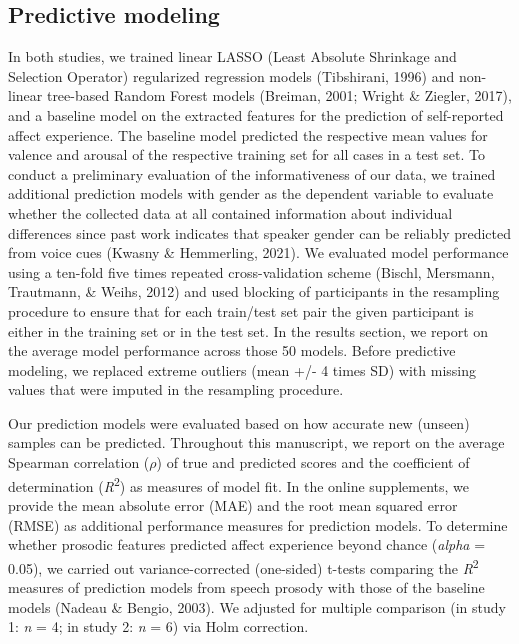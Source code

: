 \documentclass[
  english,
  man,floatsintext]{apa6}
\begin{document}
\hypertarget{predictive-modeling}{%
\subsection{Predictive modeling}\label{predictive-modeling}}

In both studies, we trained linear LASSO (Least Absolute Shrinkage and Selection Operator) regularized regression models (Tibshirani, 1996) and non-linear tree-based Random Forest models (Breiman, 2001; Wright \& Ziegler, 2017), and a baseline model on the extracted features for the prediction of self-reported affect experience. The baseline model predicted the respective mean values for valence and arousal of the respective training set for all cases in a test set. To conduct a preliminary evaluation of the informativeness of our data, we trained additional prediction models with gender as the dependent variable to evaluate whether the collected data at all contained information about individual differences since past work indicates that speaker gender can be reliably predicted from voice cues (Kwasny \& Hemmerling, 2021). We evaluated model performance using a ten-fold five times repeated cross-validation scheme (Bischl, Mersmann, Trautmann, \& Weihs, 2012) and used blocking of participants in the resampling procedure to ensure that for each train/test set pair the given participant is either in the training set or in the test set. In the results section, we report on the average model performance across those 50 models. Before predictive modeling, we replaced extreme outliers (mean +/- 4 times SD) with missing values that were imputed in the resampling procedure.

Our prediction models were evaluated based on how accurate new (unseen) samples can be predicted. Throughout this manuscript, we report on the average Spearman correlation (\(\rho\)) of true and predicted scores and the coefficient of determination (\emph{R}\textsuperscript{2}) as measures of model fit. In the online supplements, we provide the mean absolute error (MAE) and the root mean squared error (RMSE) as additional performance measures for prediction models. To determine whether prosodic features predicted affect experience beyond chance (\emph{alpha} = 0.05), we carried out variance-corrected (one-sided) t-tests comparing the \emph{R}\textsuperscript{2} measures of prediction models from speech prosody with those of the baseline models (Nadeau \& Bengio, 2003). We adjusted for multiple comparison (in study 1: \emph{n} = 4; in study 2: \emph{n} = 6) via Holm correction.
\end{document}
